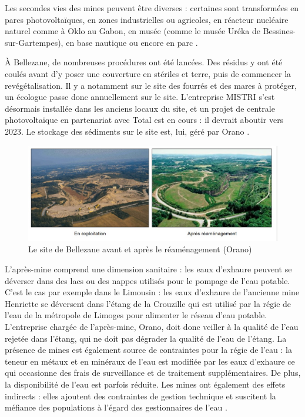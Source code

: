 \documentclass{article}
\begin{document}
Les secondes vies des mines peuvent être diverses : certaines sont transformées en parcs photovoltaïques, en zones industrielles ou agricoles, en réacteur nucléaire naturel comme à Oklo au Gabon, en musée (comme le musée Uréka de Bessines-sur-Gartempes), en base nautique ou encore en parc  \cite{himeur_apres-mine_2020}.

À Bellezane, de nombreuses procédures ont été lancées. Des résidus y ont été coulés avant d’y poser une couverture en stériles et terre, puis de commencer la revégétalisation. Il y a notamment sur le site des fourrés et des mares à protéger, un écologue passe donc annuellement sur le site. L’entreprise MISTRI s’est désormais installée dans les anciens locaux du site, et un projet de centrale photovoltaïque en partenariat avec Total est en cours : il devrait aboutir vers 2023. Le stockage des sédiments sur le site est, lui, géré par Orano \cite{benesteau_site_2020}.

\begin{figure}[!hbt]
    \centering
    \includegraphics[width=\linewidth]{I_B_2.jpg}
    \caption{Le site de Bellezane avant et après le réaménagement (Orano)}
    \label{fig:bellezane_avant_apres}
\end{figure}

L’après-mine comprend une dimension sanitaire : les eaux d’exhaure peuvent se déverser dans des lacs ou des nappes utilisés pour le pompage de l’eau potable. C’est le cas par exemple dans le Limousin : les eaux d’exhaure de l’ancienne mine Henriette se déversent dans l’étang de la Crouzille qui est utilisé par la régie de l’eau de la métropole de Limoges pour alimenter le réseau d’eau potable. L’entreprise chargée de l’après-mine, Orano, doit donc veiller à la qualité de l’eau rejetée dans l’étang, qui ne doit pas dégrader la qualité de l’eau de l’étang. La présence de mines est également source de contraintes pour la régie de l’eau : la teneur en métaux et en minéraux de l’eau est modifiée par les eaux d’exhaure ce qui occasionne des frais de surveillance et de traitement supplémentaires. De plus, la disponibilité de l’eau est parfois réduite. Les mines ont également des effets indirects : elles ajoutent des contraintes de gestion technique et suscitent la méfiance des populations à l’égard des gestionnaires de l’eau \cite{vialleseche_station_2020}.
\end{document}
